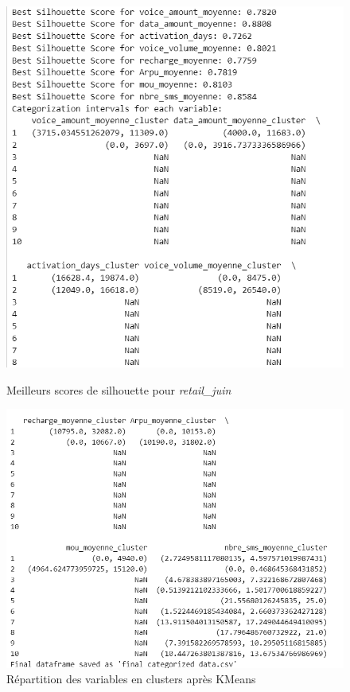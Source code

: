 \begin{figure}[H]
    \centering
    \begin{minipage}{0.45\linewidth}
        \centering
        \includegraphics[width=1\linewidth]{capture_modele_18.png}
        \caption{Meilleurs scores de silhouette pour \textit{retail\_juin}}
        \label{fig:kmeans_intervals}
    \end{minipage}\hfill
    \begin{minipage}{0.45\linewidth}
        \centering
        \includegraphics[width=1\linewidth]{capture_modele_19.png}
        \caption{Répartition des variables en clusters après KMeans}
        \label{kmeans_clusters}
    \end{minipage}
\end{figure}


